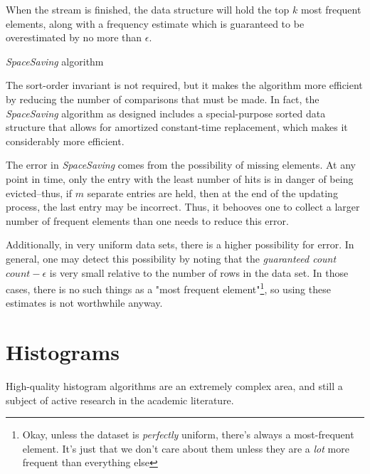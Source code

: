 When the stream is finished, the data structure will hold the top $k$ most frequent elements, along with a frequency estimate which is guaranteed to be overestimated by no more than $\epsilon$.

\begin{algorithm}
				\caption{\emph{SpaceSaving} algorithm}
\end{algorithm}

The sort-order invariant is not required, but it makes the algorithm more efficient by reducing the number of comparisons that must be made. In fact, the \emph{SpaceSaving} algorithm as designed includes a special-purpose sorted data structure that allows for amortized constant-time replacement, which makes it considerably more efficient.

The error in \emph{SpaceSaving} comes from the possibility of missing elements. At any point in time, only the entry with the least number of hits is in danger of being evicted--thus, if $m$ separate entries are held, then at the end of the updating process, the last entry may be incorrect. Thus, it behooves one to collect a larger number of frequent elements than one needs to reduce this error.

Additionally, in very uniform data sets, there is a higher possibility for error. In general, one may detect this possibility by noting that the \emph{guaranteed count} $count-\epsilon$ is very small relative to the number of rows in the data set. In those cases, there is no such things as a "most frequent element"\footnote{Okay, unless the dataset is \emph{perfectly} uniform, there's always a most-frequent element. It's just that we don't care about them unless they are a \emph{lot} more frequent than everything else}, so using these estimates is not worthwhile anyway.

\section{Histograms}
\label{sec:Histograms}
High-quality histogram algorithms are an extremely complex area, and still a subject of active research in the academic literature. 

